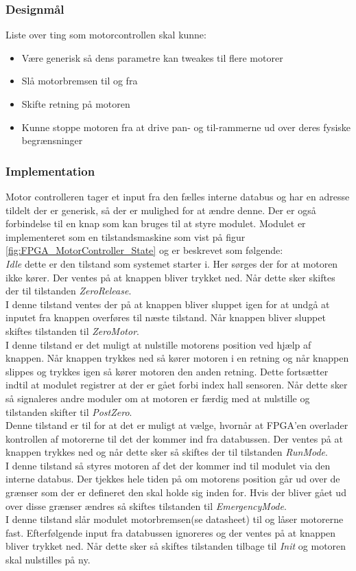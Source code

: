 \subsubsection{Designmål}
Liste over ting som motorcontrollen skal kunne:
\begin{itemize}[noitemsep]
	\item Være generisk så dens parametre kan tweakes til flere motorer
	\item Slå motorbremsen til og fra
	\item Skifte retning på motoren
	\item Kunne stoppe motoren fra at drive pan- og til-rammerne ud over deres fysiske begrænsninger
\end{itemize}

\subsubsection{Implementation}
Motor controlleren tager et input fra den fælles interne databus og har en adresse tildelt der er generisk, så der er mulighed for at ændre denne. Der er også forbindelse til en knap som kan bruges til at styre modulet. Modulet er implementeret som en tilstandsmaskine som vist på figur \ref{fig:FPGA_MotorController_State} og er beskrevet som følgende:\\
\textit{Idle} dette er den tilstand som systemet starter i. Her sørges der for at motoren ikke kører. Der ventes på at knappen bliver trykket ned. Når dette sker skiftes der til tilstanden \textit{ZeroRelease}.\\
I denne tilstand ventes der på at knappen bliver sluppet igen for at undgå at inputet fra knappen overføres til næste tilstand. Når knappen bliver sluppet skiftes tilstanden til \textit{ZeroMotor}.\\ 
I denne tilstand er det muligt at nulstille motorens position ved hjælp af knappen. Når knappen trykkes ned så kører motoren i en retning og når knappen slippes og trykkes igen så kører motoren den anden retning. Dette fortsætter indtil at modulet registrer at der er gået forbi index hall sensoren. Når dette sker så signaleres andre moduler om at motoren er færdig med at nulstille og tilstanden skifter til \textit{PostZero}.\\
Denne tilstand er til for at det er muligt at vælge, hvornår at FPGA'en overlader kontrollen af motorerne til det der kommer ind fra databussen. Der ventes på at knappen trykkes ned og når dette sker så skiftes der til tilstanden \textit{RunMode}. \\
I denne tilstand så styres motoren af det der kommer ind til modulet via den interne databus. Der tjekkes hele tiden på om motorens position går ud over de grænser som der er defineret den skal holde sig inden for. Hvis der bliver gået ud over disse grænser ændres så skiftes tilstanden til \textit{EmergencyMode}.\\
I denne tilstand slår modulet motorbremsen(se datasheet\cite{L6203}) til og låser motorerne fast. Efterfølgende input fra databussen ignoreres og der ventes på at knappen bliver trykket ned. Når dette sker så skiftes tilstanden tilbage til \textit{Init} og motoren skal nulstilles på ny.

